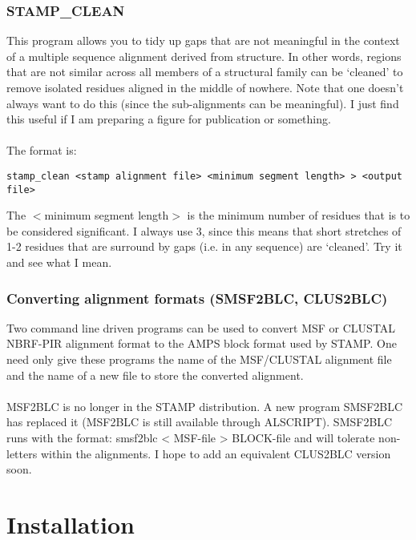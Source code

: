 \subsection{STAMP\_CLEAN}

This program allows you to tidy up gaps that are not meaningful in the context
of a multiple sequence alignment derived from structure.  In other words, regions
that are not similar across all members of a structural family can be `cleaned' to
remove isolated residues aligned in the middle of nowhere.  Note that one doesn't always 
want  to do this (since the sub-alignments can be meaningful).  I just find this
useful if I am preparing a figure for publication or something.\\
\\
The format is:

\begin{scriptsize}\begin{verbatim}
stamp_clean <stamp alignment file> <minimum segment length> > <output file>
\end{verbatim} \end{scriptsize}

The $<$minimum segment length$>$ is the minimum number of residues that is to
be considered significant.  I always use 3, since this means that short stretches of
1-2 residues that are surround by gaps (i.e. in any sequence) are `cleaned'.  Try it 
and see what I mean.

\subsection{Converting alignment formats (SMSF2BLC, CLUS2BLC)}

Two command line driven programs can be used to convert MSF or CLUSTAL NBRF-PIR
alignment format to the AMPS block format used by STAMP.  One need only give
these programs the name of the MSF/CLUSTAL alignment file and the name of a new
file to store the converted alignment.\\
\\
MSF2BLC is no longer in the STAMP distribution.  A new program SMSF2BLC
has replaced it (MSF2BLC is still available through ALSCRIPT).
SMSF2BLC runs with the format:
smsf2blc < MSF-file > BLOCK-file and will tolerate non-letters within the alignments.
I hope to  add an equivalent CLUS2BLC version soon.

\chapter{Installation}

